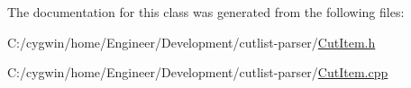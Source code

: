 The documentation for this class was generated from the following files\+:\begin{DoxyCompactItemize}
\item 
C\+:/cygwin/home/\+Engineer/\+Development/cutlist-\/parser/\hyperlink{_cut_item_8h}{Cut\+Item.\+h}\item 
C\+:/cygwin/home/\+Engineer/\+Development/cutlist-\/parser/\hyperlink{_cut_item_8cpp}{Cut\+Item.\+cpp}\end{DoxyCompactItemize}
